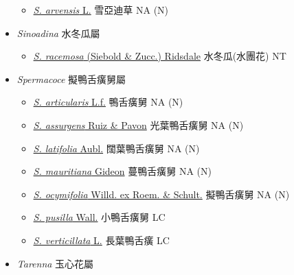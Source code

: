 \begin{itemize}
  \begin{itemize}
        \item[] \href{http://www.theplantlist.org/tpl1.1/search?q=Sherardia+arvensis}{\textit{S. arvensis} L.}   雪亞迪草   NA (N)
  \end{itemize}
 \item[] \textit{Sinoadina} 水冬瓜屬
                                
  \begin{itemize}
        \item[] \href{http://www.theplantlist.org/tpl1.1/search?q=Sinoadina+racemosa}{\textit{S. racemosa} (Siebold \& Zucc.) Ridsdale}   水冬瓜(水團花)   NT
  \end{itemize}
 \item[] \textit{Spermacoce} 擬鴨舌癀舅屬
                                
  \begin{itemize}
        \item[] \href{http://www.theplantlist.org/tpl1.1/search?q=Spermacoce+articularis}{\textit{S. articularis} L.f.}   鴨舌癀舅   NA (N)
        \item[] \href{http://www.theplantlist.org/tpl1.1/search?q=Spermacoce+assurgens}{\textit{S. assurgens} Ruiz \& Pavon}   光葉鴨舌癀舅   NA (N)
        \item[] \href{http://www.theplantlist.org/tpl1.1/search?q=Spermacoce+latifolia}{\textit{S. latifolia} Aubl.}   闊葉鴨舌癀舅   NA (N)
        \item[] \href{http://www.theplantlist.org/tpl1.1/search?q=Spermacoce+mauritiana}{\textit{S. mauritiana} Gideon}   蔓鴨舌癀舅   NA (N)
        \item[] \href{http://www.theplantlist.org/tpl1.1/search?q=Spermacoce+ocymifolia}{\textit{S. ocymifolia} Willd. ex Roem. \& Schult.}   擬鴨舌癀舅   NA (N)
        \item[] \href{http://www.theplantlist.org/tpl1.1/search?q=Spermacoce+pusilla}{\textit{S. pusilla} Wall.}   小鴨舌癀舅   LC
        \item[] \href{http://www.theplantlist.org/tpl1.1/search?q=Spermacoce+verticillata}{\textit{S. verticillata} L.}   長葉鴨舌癀   LC
  \end{itemize}
 \item[] \textit{Tarenna} 玉心花屬
                                

\end{itemize}
